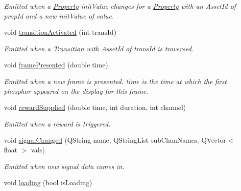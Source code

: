 \begin{DoxyCompactItemize}
\begin{DoxyCompactList}\small\item\em Emitted when a \hyperlink{class_picto_1_1_property}{Property} init\-Value changes for a \hyperlink{class_picto_1_1_property}{Property} with an Asset\-Id of prop\-Id and a new init\-Value of value. \end{DoxyCompactList}\item 
\hypertarget{class_picto_1_1_playback_state_updater_a52282a7941555630754e7c2833222a76}{void \hyperlink{class_picto_1_1_playback_state_updater_a52282a7941555630754e7c2833222a76}{transition\-Activated} (int trans\-Id)}\label{class_picto_1_1_playback_state_updater_a52282a7941555630754e7c2833222a76}

\begin{DoxyCompactList}\small\item\em Emitted when a \hyperlink{class_picto_1_1_transition}{Transition} with Asset\-Id of trans\-Id is traversed. \end{DoxyCompactList}\item 
\hypertarget{class_picto_1_1_playback_state_updater_a88f03fadc5d5f8c5b488ccffd355e9c9}{void \hyperlink{class_picto_1_1_playback_state_updater_a88f03fadc5d5f8c5b488ccffd355e9c9}{frame\-Presented} (double time)}\label{class_picto_1_1_playback_state_updater_a88f03fadc5d5f8c5b488ccffd355e9c9}

\begin{DoxyCompactList}\small\item\em Emitted when a new frame is presented. time is the time at which the first phosphor appeared on the display for this frame. \end{DoxyCompactList}\item 
void \hyperlink{class_picto_1_1_playback_state_updater_a143888735714ef4e38e96f6dc6190d8b}{reward\-Supplied} (double time, int duration, int channel)
\begin{DoxyCompactList}\small\item\em Emitted when a reward is triggered. \end{DoxyCompactList}\item 
void \hyperlink{class_picto_1_1_playback_state_updater_a8507e9d1f7975a49b9d45632a71e306a}{signal\-Changed} (Q\-String name, Q\-String\-List sub\-Chan\-Names, Q\-Vector$<$ float $>$ vals)
\begin{DoxyCompactList}\small\item\em Emitted when new signal data comes in. \end{DoxyCompactList}\item 
\hypertarget{class_picto_1_1_playback_state_updater_aa098ed4e64e19cf6c5927acca6bedd77}{void \hyperlink{class_picto_1_1_playback_state_updater_aa098ed4e64e19cf6c5927acca6bedd77}{loading} (bool is\-Loading)}\label{class_picto_1_1_playback_state_updater_aa098ed4e64e19cf6c5927acca6bedd77}


\end{DoxyCompactItemize}
